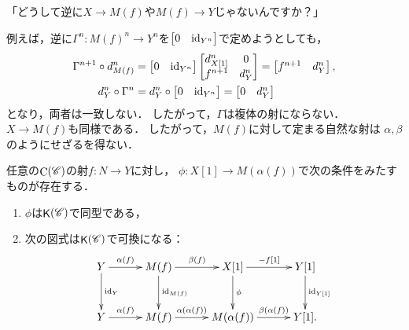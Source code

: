 \begin{com*}[4/24]
    「どうして逆に$X\to M(f)$や$M(f)\to Y$じゃないんですか？」
    
    例えば，逆に$\Gamma^n \colon M(f)^n\to Y^n$を$\begin{bmatrix*}
        0&\id_{Y^n}
    \end{bmatrix*}$で定めようとしても，
    \begin{align*}
        \Gamma^{n+1}\circ d_{M(f)}^{n}
        &=\begin{bmatrix*}
            0&\id_{Y^n}
        \end{bmatrix*}\begin{bmatrix*}
            d_{X[1]}^n & 0\\
            f^{n+1} & d_Y^n\\
        \end{bmatrix*}
        =\begin{bmatrix*}
            f^{n+1}&d_Y^n
        \end{bmatrix*},\\
        d_{Y}^n\circ \Gamma^{n}
        &=d_Y^n\circ
        \begin{bmatrix*}
            0&\id_{Y^n}
        \end{bmatrix*}
        =
        \begin{bmatrix*}
            0&d_Y^n
        \end{bmatrix*}
    \end{align*}
    となり，両者は一致しない．
    したがって，$\Gamma$は複体の射にならない．
    $X\to M(f)$も同様である．
    したがって，$M(f)$に対して定まる自然な射は
    $\alpha, \beta$のようにせざるを得ない．
\end{com*}

\begin{Lemma}
    任意の$\mathop{\mathrm{C}}\nolimits(\mathscr{C})$の射$f\colon N\to Y$に対し，
    $\phi\colon X[1]\to M(\alpha(f))$で次の条件をみたすものが存在する．
    \begin{enumerate}
        \item $\phi$は$\mathop{\mathsf{K}}\nolimits(\mathscr{C})$で同型である，
        \item 次の図式は$\mathop{\mathsf{K}}\nolimits(\mathscr{C})$で可換になる：    
        \begin{equation*}
            \vcenter{\xymatrix@C=30pt@R=30pt{
            Y \ar[r]^-{\alpha(f)}
            \ar[d]^-{\id_Y}
            & 
            M(f)
            \ar[r]^-{\beta(f)}
            \ar[d]^-{\id_{M(f)}}
            &
            X[1]
            \ar[r]^-{-f[1]}
            \ar[d]^-{\phi} 
            &
            Y[1]
            \ar[d]^-{\id_{Y[1]}}
            \\
            Y 
            \ar[r]^-{\alpha(f)}
            & 
            M(f)
            \ar[r]^-{\alpha(\alpha(f))}
            &
            M(\alpha(f))
            \ar[r]^-{\beta(\alpha(f))}
            &
            Y[1].
            }}
        \end{equation*}
    \end{enumerate}
\end{Lemma}

